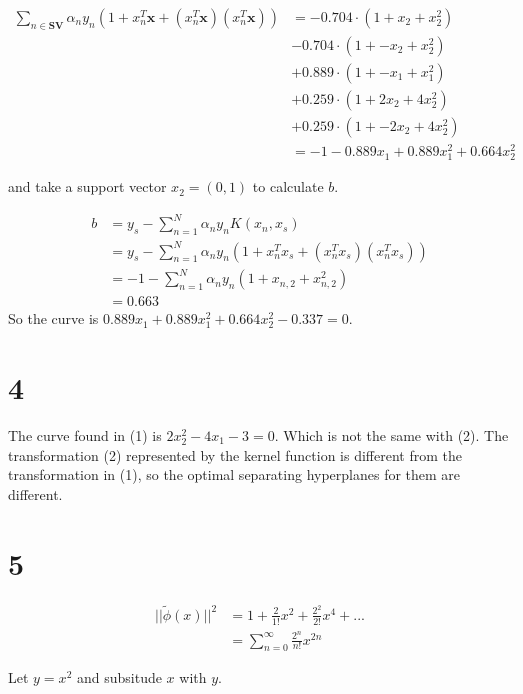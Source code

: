 \documentclass[12pt]{article}
\begin{document}
\begin{equation*}
\begin{split}
    \sum_{n\in \textbf{SV}} \alpha_n y_n (1 +x_n^T \bm{x} + (x_n^T \bm{x})(x_n^T \bm{x}))
    &= -0.704 \cdot ( 1 + x_2 + x_2^2) \\
    &-0.704 \cdot (1 + -x_2 + x_2^2) \\ 
    &+ 0.889 \cdot (1 + -x_1 + x_1^2) \\ 
    &+ 0.259 \cdot (1 + 2x_2 + 4x_2^2) \\ 
    &+ 0.259 \cdot (1 + -2x_2 + 4x_2^2) \\ 
    &= -1 - 0.889 x_1 + 0.889 x_1^2 + 0.664 x_2^2
\end{split}
\end{equation*}

and take a support vector $x_2 = (0, 1)$ to calculate $b$.

\begin{equation*}
\begin{split}
   b &= y_s - \sum_{n=1}^{N} \alpha_n y_n K(x_n, x_s) \\
   &= y_s - \sum_{n=1}^{N} \alpha_n y_n (1 +x_n^T x_s + (x_n^T x_s)(x_n^T x_s)) \\
   &= -1 - \sum_{n=1}^{N} \alpha_n y_n (1 +x_{n,2} + x_{n,2}^2) \\
   &= 0.663
\end{split}
\end{equation*}
So the curve is $0.889 x_1 + 0.889 x_1^2 + 0.664 x_2^2 - 0.337 = 0$.

\section*{4}
The curve found in (1) is $2x_2^2 - 4x_1 - 3 = 0$. Which is not the same with (2).
The transformation (2) represented by the kernel function is different from the transformation in (1),
so the optimal separating hyperplanes for them are different.
\section*{5}
\begin{equation*}
\begin{split}
|| \tilde{\phi}(x) ||^2 &= 1 + \frac{2}{1!} x^2 + \frac{2^2}{2!} x^4 + ... \\
&= \sum_{n=0}^\infty \frac{2^n}{n!} x^{2n}
\end{split}
\end{equation*}

Let $y=x^2$ and subsitude $x$ with $y$. 
\end{document}
